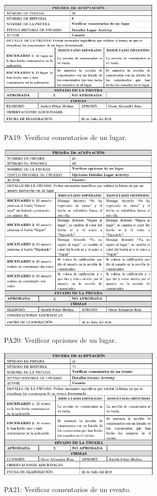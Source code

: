 \documentclass[12pt,letterpaper,openany]{book}
\begin{document}
\begin{table}[H]
\centering
\includegraphics[width=8cm]{./imagenes/PA/PA19}
\caption{PA19: Verificar comentarios de un lugar.}
\end{table}

\begin{table}[H]
\centering
\includegraphics[width=8cm]{./imagenes/PA/PA20}
\caption{PA20: Verificar opciones de un lugar.}
\end{table}

\begin{table}[H]
\centering
\includegraphics[width=8cm]{./imagenes/PA/PA21}
\caption{PA21: Verificar comentarios de un evento.}
\end{table}
\end{document}

